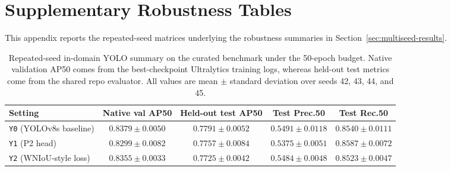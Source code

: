 \documentclass[journal,article,submit,moreauthors,pdftex]{Definitions/tsp}
\begin{document}
\section[\appendixname~\thesection]{Supplementary Robustness Tables} \label{sec:appendix-robustness}

This appendix reports the repeated-seed matrices underlying the robustness summaries in Section~\ref{sec:multiseed-results}.

\begin{table}[t]
  \centering
  \caption{Repeated-seed in-domain YOLO summary on the curated benchmark under the 50-epoch budget. Native validation AP50 comes from the best-checkpoint Ultralytics training logs, whereas held-out test metrics come from the shared repo evaluator. All values are mean $\pm$ standard deviation over seeds 42, 43, 44, and 45.}
  \label{tab:app-curated-summary}
  \footnotesize
  \setlength{\tabcolsep}{4pt}
  \begin{tabularx}{\textwidth}{>{\raggedright\arraybackslash}p{} c c c c}
    \toprule
    Setting & Native val AP50 & Held-out test AP50 & Test Prec.50 & Test Rec.50 \\
    \midrule
    \texttt{Y0} (YOLOv8s baseline) & $0.8379 \pm 0.0050$ & $0.7791 \pm 0.0052$ & $0.5491 \pm 0.0118$ & $0.8540 \pm 0.0111$ \\
    \texttt{Y1} (P2 head) & $0.8299 \pm 0.0082$ & $0.7757 \pm 0.0084$ & $0.5375 \pm 0.0051$ & $0.8587 \pm 0.0072$ \\
    \texttt{Y2} (WNIoU-style loss) & $0.8355 \pm 0.0033$ & $0.7725 \pm 0.0042$ & $0.5484 \pm 0.0048$ & $0.8523 \pm 0.0047$ \\
    \bottomrule
  \end{tabularx}
\end{table}
\end{document}
